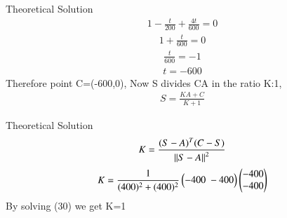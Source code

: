 \documentclass{beamer}
\begin{document}
    \begin{frame}{Theoretical Solution}
        \begin{align}
                1-\frac{t}{200}+\frac{4t}{600} = 0
            \end{align}
            \begin{align}
                1 + \frac{t}{600} = 0
            \end{align}
            \begin{align}
                \frac{t}{600}=-1
            \end{align}
            \begin{align}
                t= -600
            \end{align}
            Therefore point C=(-600,0), Now S divides CA in the ratio K:1,
            \begin{align}
                S = \frac{KA+C}{K+1}
            \end{align}
    \end{frame}
    \begin{frame}{Theoretical Solution}
            \begin{align}
                K=\frac{(S-A)^T(C-S)}{\left\lVert S-A\right\rVert^2}
            \end{align}
        \begin{align}
                K=\frac{1}{(400)^2+(400)^2}\begin{pmatrix}-400\;-400\end{pmatrix}\begin{pmatrix}-400\\-400\end{pmatrix}
            \end{align}
            By solving (30) we get K=1
    \end{frame}
    
\end{document}
